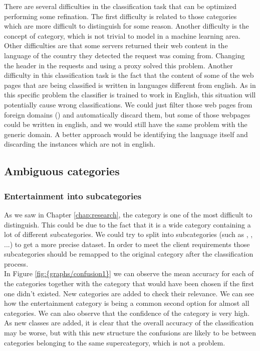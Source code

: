There are several difficulties in the classification task that can be optimized performing some refination. 
The first difficulty is related to those categories which are more difficult to distinguish for some reason. Another difficulty is the concept of  category, which is not trivial to
model in a machine learning area.
Other difficulties are that some servers returned their web content in the language of the country they detected the request was coming from. Changing the header in the requests and using a proxy 
solved this problem.  
Another difficulty in this classification task is the fact that the content of some of the web pages that are being classified is written in languages different from english. 
As in this specific problem the classifier is trained to work in English, this situation will potentially cause wrong classifications. 
We could just filter those web pages from foreign domains () and automatically discard them, but some of those webpages could be written in english, and we would still have the same 
problem with the generic  domain.
A better approach would be identifying the language itself and discarding the instances  which are not in english.


\subsection{Ambiguous categories}


\subsubsection{Entertainment into subcategories}
As we saw in Chapter \ref{chap:research}, the category  is one of the most difficult to distinguish. This could be due to the fact that it is a wide category containing a lot of different
subcategories. We could try to split  into subcategories (such as , , ...) to get a more precise dataset. In order to meet the
client requirements those subcategories should be remapped to the original  category after the classification process. \\
In Figure \ref{fig:{graphs/confusion1}} we can observe the mean accuracy for each of the categories together with the category that would have been chosen if the first one didn't existed. New
categories are added to check their relevance. We can see how the entertainment category is being a common second option for almost all categories. We can also observe that the confidence of the 
 category is very high.
As new classes are added, it is clear that the overall accuracy of the classification may be worse, but with this new structure the confusions are likely to be between categories belonging to the same
supercategory, which is not a problem.

